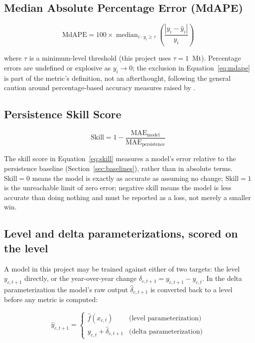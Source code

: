 \subsection{Median Absolute Percentage Error (MdAPE)}

\begin{equation}
\label{eq:mdape}
\mathrm{MdAPE} = 100 \times \operatorname{median}_{i \,:\, y_i \ge \tau}
\left( \frac{|y_i - \hat y_i|}{y_i} \right)
\end{equation}

where $\tau$ is a minimum-level threshold (this project uses
$\tau = 1$~Mt). Percentage errors are undefined or explosive as
$y_i \to 0$; the exclusion in Equation~\ref{eq:mdape} is part of the
metric's definition, not an afterthought, following the general caution
around percentage-based accuracy measures raised by
\cite{hyndman2006another}.

\subsection{Persistence Skill Score}

\begin{equation}
\label{eq:skill}
\mathrm{Skill} = 1 - \frac{\mathrm{MAE}_{\mathrm{model}}}{\mathrm{MAE}_{\mathrm{persistence}}}
\end{equation}

The skill score in Equation~\ref{eq:skill} measures a model's error
relative to the persistence baseline (Section~\ref{sec:baselines}), rather
than in absolute terms. $\mathrm{Skill}=0$ means the model is exactly as
accurate as assuming no change; $\mathrm{Skill}=1$ is the unreachable
limit of zero error; negative skill means the model is less accurate than
doing nothing and must be reported as a loss, not merely a smaller win.

\subsection{Level and delta parameterizations, scored on the level}

A model in this project may be trained against either of two targets: the
level $y_{c,t+1}$ directly, or the year-over-year change
$\delta_{c,t+1} = y_{c,t+1} - y_{c,t}$. In the delta parameterization the
model's raw output $\hat\delta_{c,t+1}$ is converted back to a level
before any metric is computed:

\begin{equation}
\label{eq:level-delta}
\hat y_{c,t+1} =
\begin{cases}
\hat f(x_{c,t}) & \text{(level parameterization)} \\[2pt]
y_{c,t} + \hat\delta_{c,t+1} & \text{(delta parameterization)}
\end{cases}
\end{equation}

